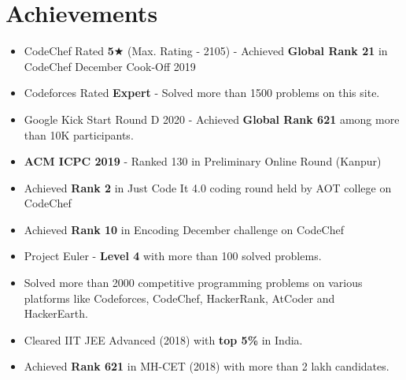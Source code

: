 \documentclass[letterpaper,11pt]{article}
\newcommand{\resumeItem}[1]{
  \item\small{
    {#1 \vspace{-2pt}}
  }
}
\newcommand{\resumeSubHeadingListStart}{\begin{itemize}[leftmargin=0.0in, label={}]}
\newcommand{\resumeSubHeadingListEnd}{\end{itemize}}
\newcommand{\resumeItemListStart}{\begin{itemize}}
\newcommand{\resumeItemListEnd}{\end{itemize}\vspace{-5pt}}
\begin{document}
\section{Achievements}
    \resumeSubHeadingListStart
        \resumeItemListStart
            \resumeItem{
            CodeChef \href{https://www.codechef.com/users/nachiketkanore}{\raisebox{-0.2\height}\faExternalLink} Rated \textbf{5}$\bigstar$ (Max. Rating - 2105) - Achieved \textbf{Global Rank 21} in CodeChef December Cook-Off 2019 \href{https://www.codechef.com/rankings/COOK113B}{\raisebox{-0.2\height}\faExternalLink}
            }
            \resumeItem{
            Codeforces \href{https://codeforces.com/profile/NachiketK}{\raisebox{-0.2\height}\faExternalLink} Rated \textbf{Expert} - Solved more than 1500 problems on this site.
            }
            \resumeItem{
            Google Kick Start Round D 2020 - Achieved \textbf{Global Rank 621} among more than 10K participants.
            }
            \resumeItem{
            \textbf{ACM ICPC 2019} - Ranked 130 in Preliminary Online Round (Kanpur) \href{https://icpc.global/ICPCID/G14IN3CN2ECD}{\raisebox{-0.2\height}\faExternalLink}
            }
            \resumeItem{
            Achieved \textbf{Rank 2} in Just Code It 4.0 coding round held by AOT college on CodeChef \href{https://www.codechef.com/rankings/JCI42021}{\raisebox{-0.2\height}\faExternalLink}
            }
            \resumeItem{
            Achieved \textbf{Rank 10} in Encoding December challenge on CodeChef \href{https://www.codechef.com/rankings/ENDE2020}{\raisebox{-0.2\height}\faExternalLink}
            }
            \resumeItem{
            Project Euler - \textbf{Level 4} with more than 100 solved problems.
            }
            \resumeItem{
            Solved more than 2000 competitive programming problems on various platforms like Codeforces, CodeChef, HackerRank, AtCoder and HackerEarth. \href{https://www.stopstalk.com/user/profile/tekichan}{\raisebox{-0.2\height}\faExternalLink}
            }
            \resumeItem{
            Cleared IIT JEE Advanced (2018) with \textbf{top 5\%} in India.
            }
            \resumeItem{
            Achieved \textbf{Rank 621} in MH-CET (2018) with more than 2 lakh candidates.
            }
        \resumeItemListEnd
        
    \resumeSubHeadingListEnd





\end{document}
